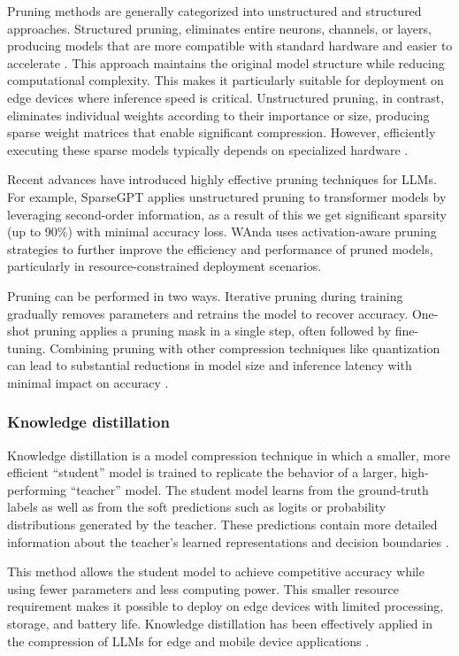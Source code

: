 \documentclass[11pt]{IEEEtran}
\begin{document}
Pruning methods are generally categorized into unstructured and structured approaches. Structured pruning, eliminates entire neurons, channels, or layers, producing models that are more compatible with standard hardware and easier to accelerate \cite{b23}. This approach maintains the original model structure while reducing computational complexity. This makes it particularly suitable for deployment on edge devices where inference speed is critical. Unstructured pruning, in contrast, eliminates individual weights according to their importance or size, producing sparse weight matrices that enable significant compression. However, efficiently executing these sparse models typically depends on specialized hardware \cite{b19,b22}. 

Recent advances have introduced highly effective pruning techniques for LLMs. For example, SparseGPT \cite{b20} applies unstructured pruning to transformer models by leveraging second-order information, as a result of this we get significant sparsity (up to 90\%) with minimal accuracy loss. WAnda \cite{b21} uses activation-aware pruning strategies to further improve the efficiency and performance of pruned models, particularly in resource-constrained deployment scenarios.

Pruning can be performed in two ways. Iterative pruning during training gradually removes
parameters and retrains the model to recover accuracy. One-shot pruning applies a pruning mask in a single step, often followed by fine-tuning. Combining pruning with other compression techniques like quantization can lead to substantial reductions in model size and inference latency with minimal impact on accuracy \cite{b7}.

\subsubsection{Knowledge distillation}

Knowledge distillation is a model compression technique in which a smaller, more efficient
``student'' model is trained to replicate the behavior of a larger, high-performing ``teacher'' model. The student model learns from the ground-truth labels as well as from the soft predictions such as logits or probability distributions generated by the teacher. These predictions contain more detailed information about the teacher's learned representations and decision boundaries  \cite{b24}.

This method allows the student model to achieve competitive accuracy while using fewer parameters and less computing power. This smaller resource requirement makes it possible to deploy on edge devices with limited processing, storage, and battery life. Knowledge distillation has been effectively applied in the compression of LLMs for edge and mobile device applications \cite{b25,b26}.
\end{document}
